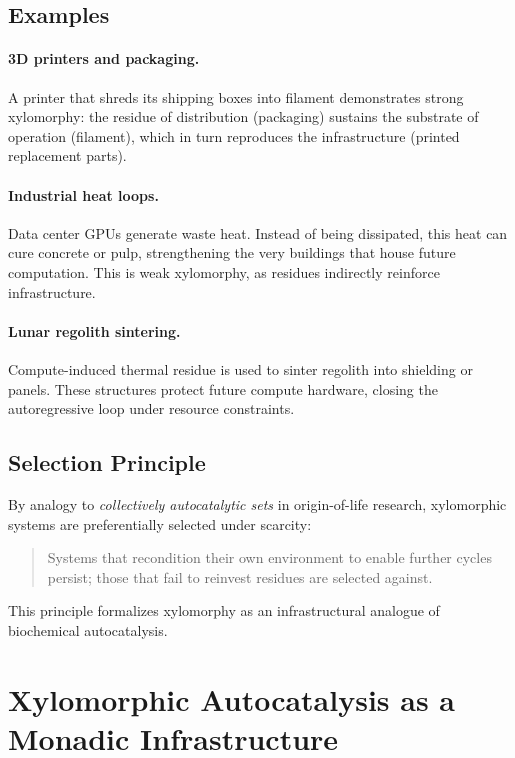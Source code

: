 \documentclass[12pt]{article}
\theoremstyle{plain}
\begin{document}
{{{{{{{{{{{{{{{{\subsection{Examples}

\paragraph{3D printers and packaging.}  
A printer that shreds its shipping boxes into filament demonstrates strong xylomorphy: the residue of distribution (packaging) sustains the substrate of operation (filament), which in turn reproduces the infrastructure (printed replacement parts).

\paragraph{Industrial heat loops.}  
Data center GPUs generate waste heat. Instead of being dissipated, this heat can cure concrete or pulp, strengthening the very buildings that house future computation. This is weak xylomorphy, as residues indirectly reinforce infrastructure.

\paragraph{Lunar regolith sintering.}  
Compute-induced thermal residue is used to sinter regolith into shielding or panels. These structures protect future compute hardware, closing the autoregressive loop under resource constraints.

\subsection{Selection Principle}

By analogy to \emph{collectively autocatalytic sets} in origin-of-life research, xylomorphic systems are preferentially selected under scarcity:
\begin{quote}
    Systems that recondition their own environment to enable further cycles persist; those that fail to reinvest residues are selected against.
\end{quote}
This principle formalizes xylomorphy as an infrastructural analogue of biochemical autocatalysis.


\section{Xylomorphic Autocatalysis as a Monadic Infrastructure}
\label{sec:xylomorphic-autocatalysis}

}}}}}}}}}}}}}}}}
\end{document}
